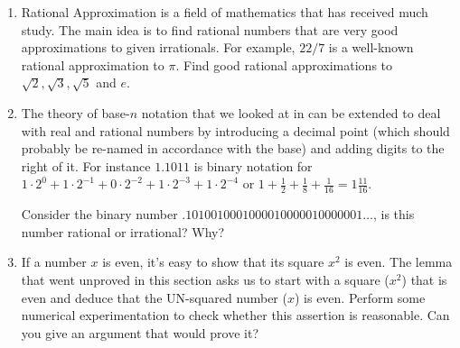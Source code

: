 \begin{enumerate}

\item {} Rational Approximation is 
a field of mathematics that has received much study.  The main idea 
is to find rational numbers that are very good approximations to
given irrationals.  For example, $22/7$ is a well-known rational 
approximation to $\pi$.  Find good rational approximations to 
$\sqrt{2}, \sqrt{3}, \sqrt{5}$ and $e$.

\vfill

\wbvfill


\vfill

\item The theory of base-$n$ notation that we looked at in 
 can be extended to deal with real and 
rational numbers by introducing a decimal point (which should 
probably be re-named in accordance with the base) and adding 
digits to the right of it.  For instance $1.1011$ is binary notation
for $1 \cdot 2^0 + 1 \cdot 2^{-1} + 0 \cdot 2^{-2} + 
1\cdot 2^{-3} + 1\cdot 2^{-4}$ or $\displaystyle 1 + \frac{1}{2} + 
\frac{1}{8} + \frac{1}{16} = 1 \frac{11}{16}$.

Consider the binary number $.1010010001000010000010000001\ldots$, 
is this number rational or irrational?  Why?

\vfill


\workbookpagebreak
\hintspagebreak

\item If a number $x$ is even, it's easy to show that its square $x^2$
is even.  The lemma that went unproved in this section asks us to
start with a square ($x^2$) that is even and deduce that the UN-squared
number ($x$) is even.  Perform some numerical experimentation to
check whether this assertion is reasonable.  Can you give an argument
that would prove it?

\vfill


\end{enumerate}
